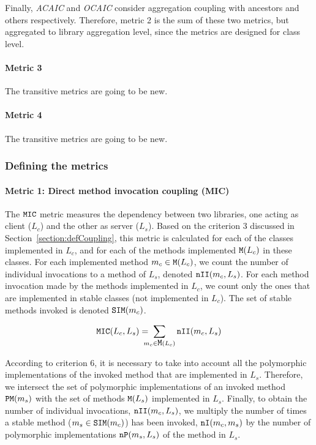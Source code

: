 Finally, \textit{ACAIC} and \textit{OCAIC} consider aggregation coupling with ancestors and others respectively. Therefore, metric 2 is the sum of these two metrics, but aggregated to library aggregation level, since the metrics are designed for class level.

\paragraph{Metric 3}
The transitive metrics are going to be new.

\paragraph{Metric 4}
The transitive metrics are going to be new.


\subsubsection{Defining the metrics}
\paragraph{Metric 1: Direct method invocation coupling (MIC)}
The $\verb|MIC|$ metric measures the dependency between two libraries, one acting as client ($L_c$) and the other as server ($L_s$).%
Based on the criterion 3 discussed in Section~\ref{section:defCoupling}, this metric is calculated for each of the classes implemented in $L_c$, and for each of the methods implemented $\verb|M|(L_c)$ in these classes. For each implemented method  $m_c \in \verb|M|(L_c)$, we count the number of individual invocations to a method of $L_s$, denoted $\verb|nII|(m_c,L_s)$. For each method invocation made by the methods implemented in $L_c$, we count only the ones that are implemented in stable classes (not implemented in $L_c$). The set of stable methods invoked is denoted $\verb|SIM|(m_c)$.

\begin{equation*}
\verb|MIC|(L_c, L_s) =\!\!\!\!\! \sum_{m_c \in \verb|M|(L_c)} \verb|nII|(m_c, L_s)
\end{equation*}

According to criterion 6, it is necessary to take into account all the polymorphic implementations of the invoked method that are implemented in $L_s$. Therefore, we intersect the set of polymorphic implementations of an invoked method $\verb|PM|(m_s)$ with the set of methods $\verb|M|(L_s)$ implemented in $L_s$. Finally, to obtain the number of individual invocations, $\verb|nII|(m_c,L_s)$, we multiply the number of times a stable method ($m_s \in \verb|SIM|(m_c)$) has been invoked, $\verb|nI|(m_c, m_s)$ by the number of polymorphic implementations $\verb|nP|(m_s, L_s)$ of the method in $L_s$.

